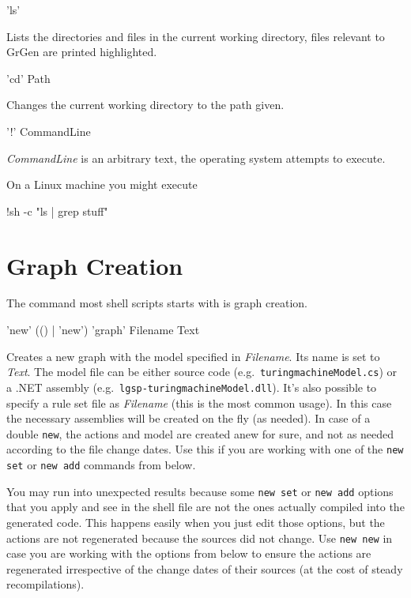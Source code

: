 \begin{rail}
  'ls'
\end{rail}
Lists the directories and files in the current working directory, files relevant to GrGen are printed highlighted.

\begin{rail}
  'cd' Path
\end{rail}
Changes the current working directory to the path given.

\begin{rail}
  '!' CommandLine
\end{rail}
\emph{CommandLine} is an arbitrary text, the operating system attempts to execute.
\begin{example}
On a Linux machine you might execute
\begin{grshell}
!sh -c "ls | grep stuff"
\end{grshell}
\end{example}


\section{Graph Creation}
\label{graphcreationcommands}

The command most shell scripts starts with is graph creation.

\begin{rail}
  'new' (() | 'new') 'graph' Filename Text
\end{rail}
Creates a new graph with the model specified in \emph{Filename}.
Its name is set to \emph{Text}.
The model file can be either source code (e.g.\ \texttt{turing\textunderscore machineModel.cs}) or a .NET assembly (e.g.\ \texttt{lgsp-turing\textunderscore machineModel.dll}).
It's also possible to specify a rule set file as \emph{Filename} (this is the most common usage).
In this case the necessary assemblies will be created on the fly (as needed).
In case of a double \texttt{new}, the actions and model are created anew for sure, and not as needed according to the file change dates.
Use this if you are working with one of the \texttt{new set} or \texttt{new add} commands from below.

\begin{warning}
You may run into unexpected results because some \texttt{new set} or \texttt{new add} options that you apply and see in the shell file are not the ones actually compiled into the generated code.
This happens easily when you just edit those options, but the actions are not regenerated because the sources did not change.
Use \texttt{new new} in case you are working with the options from below to ensure the actions are regenerated irrespective of the change dates of their sources (at the cost of steady recompilations).
\end{warning}

